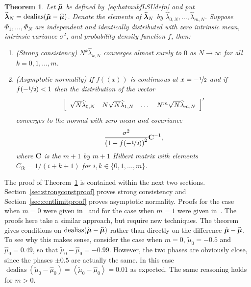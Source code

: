 \documentclass[aap]{imsart}
\newcommand{\dealias}{\operatorname{dealias}}
\newcommand{\fracpart}[1]{\left\langle #1 \right\rangle}
\newtheorem{theorem}{Theorem}
\begin{document}
\begin{theorem} \label{thm:asymp_proof} 
Let $\widehat{\boldsymbol{\mu}}$ be defined by~\eqref{eq:hatmubfLSUdefn} and put $\widehat{\lambdabf}_N = \dealias(\tilde{\mubf} - \widehat{\mubf})$.  Denote the elements of $\widehat{\boldsymbol{\lambda}}_N$ by $\widehat{\lambda}_{0,N}, \dots, \widehat{\lambda}_{m,N}$.  Suppose $\Phi_1, \dots, \Phi_N$ are independent and identically distributed with zero intrinsic mean, intrinsic variance $\sigma^2$, and probability density function $f$, then: 
\begin{enumerate}
\item (Strong consistency) $N^k \widehat{\lambda}_{k,N}$ converges almost surely to $0$ as $N\rightarrow\infty$ for all $k = 0, 1, \dots, m$.
\item (Asymptotic normality) If $f(\fracpart{x})$ is continuous at $x = -\nicefrac{1}{2}$ and if $f(-\nicefrac{1}{2}) < 1$ then the distribution of the vector
\[
\left[
\begin{array}
[c]{cccc}%
\sqrt{N} \widehat{\lambda}_{0,N} & N \sqrt{N}\widehat{\lambda}_{1,N}  & \dots & N^m\sqrt{N} \widehat{\lambda}_{m,N}
\end{array}
\right]^\prime
\]
converges to the normal with zero mean and covariance
\[
\frac{\sigma^2}{\left(1-f( -\nicefrac{1}{2}) \right)^{2}} \mathbf{C}^{-1},
\]
where $\mathbf{C}$ is the $m+1$ by $m+1$ Hilbert matrix with elements $C_{ik} = 1/(i + k + 1)$ for $i,k \in \{0, 1, \dots, m\}$.
\end{enumerate}
\end{theorem}
The proof of Theorem~\ref{thm:asymp_proof} is contained within the next two sections. Section~\ref{sec:strongconstproof} proves strong consistency and Section~\ref{sec:centlimitproof} proves asymptotic normality.  Proofs for the case when $m=0$ were given in~\cite{McKilliam_mean_dir_est_sq_arc_length2010} and for the case when $m=1$ were given in~\cite{McKilliamFrequencyEstimationByPhaseUnwrapping2009}.  The proofs here take a similar approach, but require new techniques.  %
The theorem gives conditions on $\dealias(\tilde{\mubf} - \widehat{\mubf})$ rather than directly on the difference $\tilde{\boldsymbol{\mu}} - \widehat{\boldsymbol{\mu}}$.   To see why this makes sense, consider the case when $m=0$, $\tilde{\mu}_0 = -0.5$ and $\widehat{\mu}_0 = 0.49$, so that $\tilde{\mu}_0 - \widehat{\mu}_0 = -0.99$.  However, the two phases are obviously close, since the phases $\pm 0.5$ are actually the same.  In this case $\dealias(\tilde{\mu}_0 - \widehat{\mu}_0) = \fracpart{\tilde{\mu}_0 - \widehat{\mu}_0} = 0.01$ as expected.  The same reasoning holds for $m > 0$.
\end{document}
